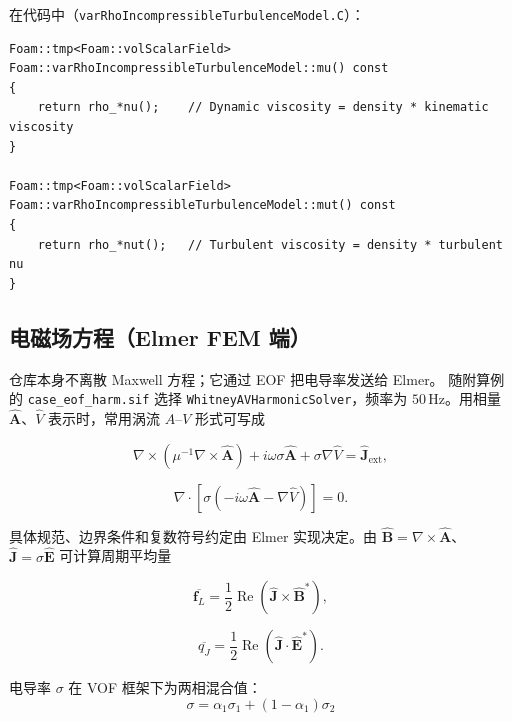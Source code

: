 \documentclass[11pt,a4paper]{article}
\begin{document}
在代码中（\texttt{varRhoIncompressibleTurbulenceModel.C}）：

\begin{lstlisting}[style=cppstyle]
Foam::tmp<Foam::volScalarField>
Foam::varRhoIncompressibleTurbulenceModel::mu() const
{
    return rho_*nu();    // Dynamic viscosity = density * kinematic viscosity
}

Foam::tmp<Foam::volScalarField>
Foam::varRhoIncompressibleTurbulenceModel::mut() const
{
    return rho_*nut();   // Turbulent viscosity = density * turbulent nu
}
\end{lstlisting}

\subsection{电磁场方程（Elmer FEM 端）}

仓库本身不离散 Maxwell 方程；它通过 EOF 把电导率发送给 Elmer。
随附算例的 \texttt{case\_eof\_harm.sif} 选择
\texttt{WhitneyAVHarmonicSolver}，频率为 $50\,\mathrm{Hz}$。用相量
$\widehat{\mathbf A}$、$\widehat V$ 表示时，常用涡流 $A$--$V$
形式可写成

\begin{equation}
\nabla\times\left(\mu^{-1}\nabla\times\widehat{\mathbf A}\right)
+i\omega\sigma\widehat{\mathbf A}
+\sigma\nabla\widehat V
=\widehat{\mathbf J}_{\mathrm{ext}},
\label{eq:magnetic}
\end{equation}

\begin{equation}
\nabla\cdot\left[
\sigma\left(-i\omega\widehat{\mathbf A}-\nabla\widehat V\right)
\right]=0 .
\label{eq:electric}
\end{equation}

具体规范、边界条件和复数符号约定由 Elmer 实现决定。由
$\widehat{\mathbf B}=\nabla\times\widehat{\mathbf A}$、
$\widehat{\mathbf J}=\sigma\widehat{\mathbf E}$ 可计算周期平均量

\begin{equation}
\overline{\mathbf f_L}
=\frac{1}{2}\operatorname{Re}
\left(\widehat{\mathbf J}\times\widehat{\mathbf B}^{*}\right),
\end{equation}

\begin{equation}
\overline{q_J}
=\frac{1}{2}\operatorname{Re}
\left(\widehat{\mathbf J}\cdot\widehat{\mathbf E}^{*}\right).
\end{equation}

电导率 $\sigma$ 在 VOF 框架下为两相混合值：
\begin{equation}
\sigma = \alpha_1 \sigma_1 + (1 - \alpha_1) \sigma_2
\end{equation}
\end{document}
